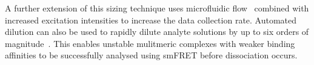 A further extension of this sizing technique uses microfluidic flow~\cite{horrocks12} combined with increased excitation intensities to increase the data collection rate. Automated dilution can also be used to rapidly dilute analyte solutions by up to six orders of magnitude~\cite{horrocks2013}. This enables unstable mulitmeric complexes with weaker binding affinities to be successfully analysed using smFRET before dissociation occurs.  









